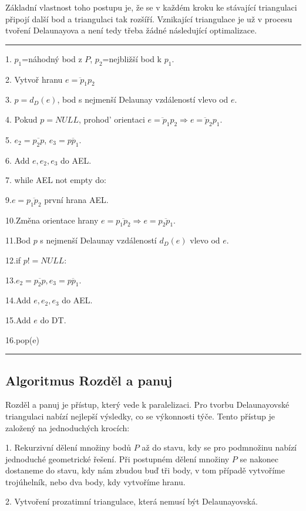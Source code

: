 \documentclass[12pt,a4paper]{article}
\begin{document}
Základní vlastnost toho postupu je, že se v každém kroku ke stávající triangulaci připojí další bod a triangulaci tak rozšíří. Vznikající triangulace je už v procesu tvoření Delaunayova a není tedy třeba žádné následující optimalizace.

\bigskip
\hrule
1. $p_1$=náhodný bod z $P$, $p_2$=nejbližší bod k $p_1$.

2. Vytvoř hranu $\overline{e=p_1p_2}$

3. $p=d_D(e)$, bod s nejmenší Delaunay vzdáleností vlevo od $e$.

4. Pokud $p=NULL$, prohod’ orientaci $\overline{e=p_1p_2} \Rightarrow \overline{e=p_2p_1}$.

5. $e_2=\overline{p_2p}$, $e_3=\overline{pp_1}$.

6. Add $e, e_2, e_3$ do AEL.

7. while AEL not empty do:

9.\indent  $e=\overline{p_1p_2}$ první hrana AEL.

10.\indent  Změna orientace hrany $e=\overline{p_1p_2} \Rightarrow e=\overline{p_2p_1}$.

11.\indent  Bod $p$ s nejmenší Delaunay vzdáleností $d_D(e)$ vlevo od $e$.

12.\indent  if $p! =NULL:$

13.\indent \indent $e_2=\overline{p_2p}, e_3=\overline{pp_1}$.

14.\indent \indent Add $e, e_2, e_3$ do AEL.

15.\indent \indent Add $e$ do DT.

16.\indent pop(e)
\newline
\hrule

\newpage
\subsection{Algoritmus Rozděl a panuj}

Rozděl a panuj je přístup, který vede k paralelizaci. Pro tvorbu Delaunayovské triangulaci nabízí nejlepší výsledky, co se výkonnosti týče. Tento přístup je založený na jednoduchých krocích:

1. Rekurzivní dělení množiny bodů $P$ až do stavu, kdy se pro podmnožinu nabízí jednoduché geometrické řešení. Při postupném dělení množiny $P$ se nakonec dostaneme do stavu, kdy nám zbudou buď tři body, v tom případě vytvoříme trojúhelník, nebo dva body, kdy vytvoříme hranu.

2. Vytvoření prozatimní triangulace, která nemusí být Delaunayovská.
\end{document}
